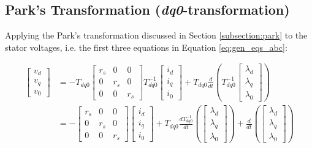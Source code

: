 \subsection{Park's Transformation (\textit{dq0}-transformation)}

Applying the Park's transformation discussed in Section \ref{subsection:park}
to the stator voltages, i.e. the first three equations in
Equation \ref{eq:gen_eqs_abc}:

\begin{equation*}
    \begin{aligned}
        \begin{bmatrix}
            v_d \\ v_q \\ v_0
        \end{bmatrix}
        &= -T_{dq0}
        \begin{bmatrix}
            r_s & 0 & 0\\
            0 & r_s & 0\\
            0 & 0 & r_s
        \end{bmatrix}
        T_{dq0}^{-1}
        \begin{bmatrix}
            i_d \\ i_q \\ i_0
        \end{bmatrix}
        +
        T_{dq0}\frac{d}{dt}\left(T_{dq0}^{-1}\begin{bmatrix}\lambda_d \\ \lambda_q\\ \lambda_0\end{bmatrix}\right)\\
        &= -
        \begin{bmatrix}
            r_s & 0 & 0\\
            0 & r_s & 0\\
            0 & 0 & r_s
        \end{bmatrix}
        \begin{bmatrix}
            i_d \\ i_q \\ i_0
        \end{bmatrix}
        +
        T_{dq0}\frac{dT_{dq0}^{-1}}{dt}\left(\begin{bmatrix}\lambda_d \\ \lambda_q\\ \lambda_0\end{bmatrix}\right) + \frac{d}{dt} \left(\begin{bmatrix}\lambda_d \\ \lambda_q\\ \lambda_0\end{bmatrix}\right) \\ 

\end{aligned}
\end{equation*}
